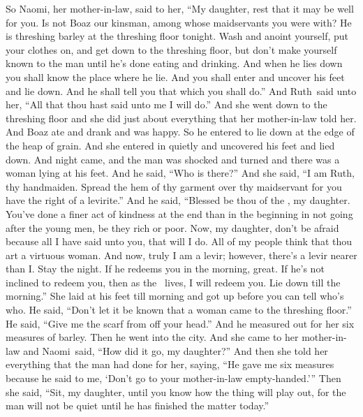 
\begin{inparaenum}
   So Naomi, her mother-in-law, said to her, ``My daughter, rest that it may be well for you.%
   Is not Boaz our kinsman, among whose maidservants you were with? He is threshing barley at the threshing floor tonight.%
   Wash and anoint yourself, put your clothes on, and get down to the threshing floor, but don't make yourself known to the man until he's done eating and drinking.%
   And when he lies down you shall know the place where he lie. And you shall enter and uncover his feet and lie down. And he shall tell you that which you shall do.''%
   And Ruth\understood{}\ said unto her, ``All that thou hast said unto me I will do.''%
   And she went down to the threshing floor and she did just about everything that her mother-in-law told her.%
   And Boaz ate and drank and was happy. So he entered to lie down at the edge of the heap of grain. And she entered in quietly and uncovered his feet and lied down.%
   And night came, and the man was shocked and turned and there was a woman lying at his feet.%
   And he said, ``Who is there?'' And she said, ``I am Ruth, thy handmaiden. Spread the hem of thy garment over thy maidservant for you have the right of a levirite.''%
   And he said, ``Blessed be thou of the \lord, my daughter. You've done a finer act of kindness at the end than in the beginning in not going after the young men, be they rich or poor.%
   Now, my daughter, don't be afraid because all I have said unto you, that will I do. All of my people think that thou art a virtuous woman.%
   And now, truly I am a levir; however, there's a levir nearer than I.%
   Stay the night. If he redeems you in the morning, great. If he's not inclined to redeem you, then as the \lord\ lives, I will redeem you. Lie down till the morning.''%
   She laid at his feet till morning and got up before you can tell who's who. He said, ``Don't let it be known that a woman came to the threshing floor.''%
   He said, ``Give me the scarf from off your head.'' And he measured out for her six measures of barley. Then he went into the city.%
   And she came to her mother-in-law and Naomi\understood{}\ said, ``How did it go, my daughter?'' And then she told her everything that the man had done for her,%
   saying, ``He gave me six measures because he said to me, `Don't go to your mother-in-law empty-handed.'\thinspace''%
   Then she said, ``Sit, my daughter, until you know how the thing will play out, for the man will not be quiet until he has finished the matter today.''%
\end{inparaenum}
